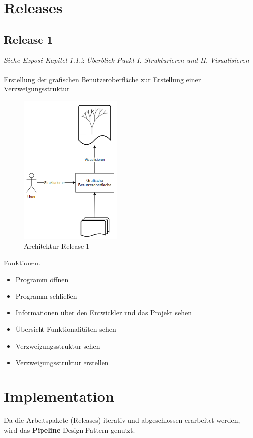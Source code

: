 \documentclass[11pt]{article}
\begin{document}
    \section{Releases}

    \subsection{Release 1}
    \textit{Siehe Exposé Kapitel 1.1.2 Überblick Punkt I. Strukturieren und II. Visualisieren}
    \\~\\
    Erstellung der grafischen Benutzeroberfläche zur Erstellung einer Verzweigungsstruktur
    
    \begin{figure}[H]
        \centering
        \includegraphics[width=5cm]{../images/Konzepte_Release_1.PNG}
        \caption{Architektur Release 1}
    \end{figure}
    Funktionen:
    \begin{itemize}
        \item Programm öffnen
        \item Programm schließen
        \item Informationen über den Entwickler und das Projekt sehen
        \item Übersicht Funktionalitäten sehen
        \item Verzweigungsstruktur sehen
        \item Verzweigungsstruktur erstellen
    \end{itemize}

    \section{Implementation}
    Da die Arbeitspakete (Releases) iterativ und abgeschlossen erarbeitet werden, wird das
    \textbf{Pipeline} Design Pattern\cite{pipeline} genutzt.

    \newpage

    ~\nocite{*}
    
    
\end{document}
